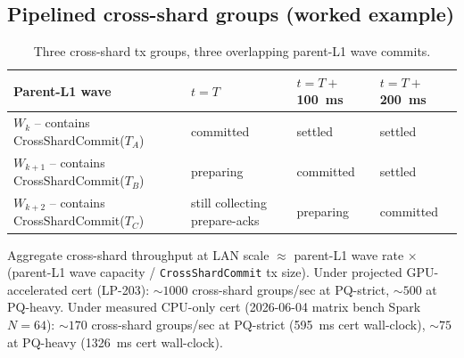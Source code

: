 \subsection{Pipelined cross-shard groups (worked example)}

\begin{table}[h]
\centering
\small
\begin{tabular}{@{}lp{2.5cm}p{2.5cm}p{2.5cm}@{}}
\toprule
\textbf{Parent-L1 wave} & \textbf{$t{=}T$} & \textbf{$t{=}T{+}$\SI{100}{\milli\second}} & \textbf{$t{=}T{+}$\SI{200}{\milli\second}} \\
\midrule
$W_k$ -- contains CrossShardCommit($T_A$) & committed & settled & settled \\
$W_{k{+}1}$ -- contains CrossShardCommit($T_B$) & preparing & committed & settled \\
$W_{k{+}2}$ -- contains CrossShardCommit($T_C$) & still collecting prepare-acks & preparing & committed \\
\bottomrule
\end{tabular}
\caption{Three cross-shard tx groups, three overlapping parent-L1
wave commits.}
\label{tab:pipeline-xshard}
\end{table}

Aggregate cross-shard throughput at LAN scale $\approx$ parent-L1
wave rate $\times$ (parent-L1 wave capacity / \texttt{CrossShardCommit}
tx size). Under projected GPU-accelerated cert (LP-203):
$\sim 1000$ cross-shard groups/sec at PQ-strict, $\sim 500$ at
PQ-heavy. Under measured CPU-only cert (2026-06-04 matrix bench
Spark $N{=}64$): $\sim 170$ cross-shard groups/sec at PQ-strict
(\SI{595}{\milli\second} cert wall-clock), $\sim 75$ at PQ-heavy
(\SI{1326}{\milli\second} cert wall-clock).
